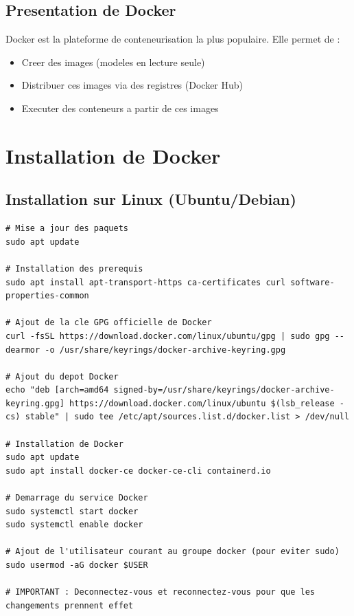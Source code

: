 \documentclass[a4paper,12pt]{article}
\begin{document}
\subsection{Presentation de Docker}
Docker est la plateforme de conteneurisation la plus populaire. Elle permet de :
\begin{itemize}
    \item Creer des images (modeles en lecture seule)
    \item Distribuer ces images via des registres (Docker Hub)
    \item Executer des conteneurs a partir de ces images
\end{itemize}

\section{Installation de Docker}

\subsection{Installation sur Linux (Ubuntu/Debian)}
\begin{lstlisting}[caption=Installation de Docker sur Ubuntu]
# Mise a jour des paquets
sudo apt update

# Installation des prerequis
sudo apt install apt-transport-https ca-certificates curl software-properties-common

# Ajout de la cle GPG officielle de Docker
curl -fsSL https://download.docker.com/linux/ubuntu/gpg | sudo gpg --dearmor -o /usr/share/keyrings/docker-archive-keyring.gpg

# Ajout du depot Docker
echo "deb [arch=amd64 signed-by=/usr/share/keyrings/docker-archive-keyring.gpg] https://download.docker.com/linux/ubuntu $(lsb_release -cs) stable" | sudo tee /etc/apt/sources.list.d/docker.list > /dev/null

# Installation de Docker
sudo apt update
sudo apt install docker-ce docker-ce-cli containerd.io

# Demarrage du service Docker
sudo systemctl start docker
sudo systemctl enable docker

# Ajout de l'utilisateur courant au groupe docker (pour eviter sudo)
sudo usermod -aG docker $USER

# IMPORTANT : Deconnectez-vous et reconnectez-vous pour que les changements prennent effet
\end{lstlisting}
\end{document}
